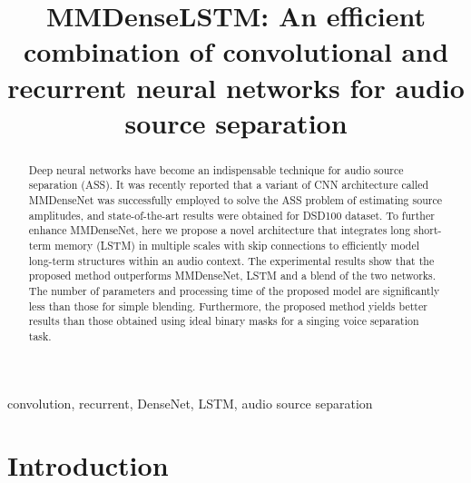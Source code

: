 \documentclass{article}
\title{MMDenseLSTM: An efficient combination of convolutional and recurrent neural networks for audio source separation}
\begin{document}
\maketitle
\begin{abstract}
Deep neural networks have become an indispensable technique for audio source separation (ASS). It was recently reported that a variant of CNN architecture called MMDenseNet was successfully employed to solve the ASS problem of estimating source amplitudes, and state-of-the-art results were obtained for DSD100 dataset. To further enhance MMDenseNet, here we propose a novel architecture that integrates long short-term memory (LSTM) in multiple scales with skip connections to efficiently model long-term structures within an audio context. The experimental results show that the proposed method outperforms MMDenseNet, LSTM and a blend of the two networks. The number of parameters and processing time of the proposed model are significantly less than those for simple blending. Furthermore, the proposed method yields better results than those obtained using ideal binary masks for a singing voice separation task.
\end{abstract}
\begin{keywords}
convolution, recurrent, DenseNet, LSTM, audio source separation
\end{keywords}

\section{Introduction}
\label{sec:intro}
\end{document}
